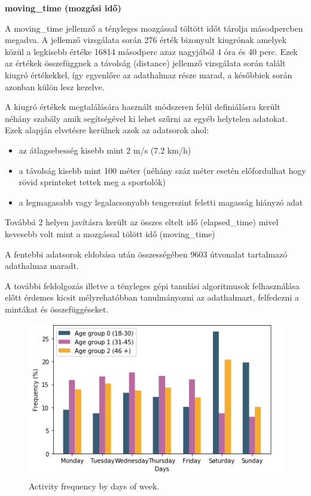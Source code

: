\textbf{moving\_time (mozgási idő)}

A moving\_time jellemző a tényleges mozgással töltött időt tárolja másodpercben megadva. A jellemző vizsgálata során 276 érték bizonyult kiugrónak amelyek közül a legkisebb értéke 16814 másodperc azaz nagyjából 4 óra és 40 perc. Ezek az értékek összefüggnek a távolság (distance) jellemző vizsgálata során talált kiugró értékekkel, így egyenlőre az adathalmaz része marad, a későbbiek során azonban külön lesz kezelve.


A kiugró értékek megtalálására használt módszeren felül definiálásra került néhány szabály amik segítségével ki lehet szűrni az egyéb helytelen adatokat. Ezek alapján elvetésre kerülnek azok az adatsorok ahol:
\begin{itemize}
	\item az átlagsebesség kisebb mint 2 m/s (7.2 km/h)
	\item a távolság kisebb mint 100 méter (néhány száz méter esetén előfordulhat hogy rövid sprinteket tettek meg a sportolók)
	\item a legmagasabb vagy legalacsonyabb tengerszint feletti magasság hiányzó adat
\end{itemize} 
Továbbá 2 helyen javításra került az összes eltelt idő (elapsed\_time) mivel kevesebb volt mint a mozgással tölött idő (moving\_time)


A fentebbi adatsorok eldobása után összességében 9603 útvonalat tartalmazó adathalmaz maradt.


A további feldolgozás illetve a tényleges gépi tanulási algoritmusok felhasználása előtt érdemes kicsit mélyrehatóbban tanulmányozni az adathalmazt, felfedezni a mintákat és összefüggéseket. 

\begin{figure}[h!]
	\includegraphics[width=\linewidth]{kepek/frequencyByAgeAndWeekdays.png}
	\caption{Activity frequency by days of week.}
	\label{fig:frequencyByWeekdays}
\end{figure}

